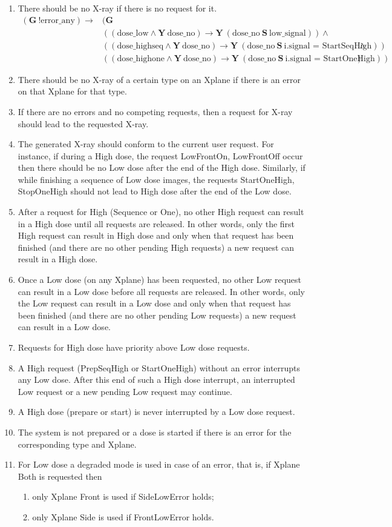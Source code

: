 \documentclass[a4paper,10pt]{article}
\newcommand{\LTLG}{\mathbf{G~}}
\newcommand{\LTLY}{\mathbf{Y~}}
\newcommand{\LTLS}{\mathbf{~S~}}
\newcommand{\imply}{\rightarrow}
\newcommand{\doselow}{\textrm{dose\_low}}
\newcommand{\doseno}{\textrm{dose\_no}}
\newcommand{\dosehighseq}{\textrm{dose\_highseq}}
\newcommand{\dosehighone}{\textrm{dose\_highone}}
\newcommand{\lowsignal}{\textrm{low\_signal}}
\newcommand{\errorany}{\textrm{error\_any}}
\begin{document}
	\begin{enumerate}
		\item There should be no X-ray if there is no request for it.
			\begin{align*}
				(\LTLG !\errorany) \imply & (\LTLG \\
					& ((\doselow \land \LTLY \doseno) \imply \LTLY (\doseno \LTLS \lowsignal)) \land \\
					& ((\dosehighseq \land \LTLY \doseno) \imply \LTLY (\doseno \LTLS \textrm{i.signal = StartSeqHigh})) \land \\
					& ((\dosehighone \land \LTLY \doseno) \imply \LTLY (\doseno \LTLS \textrm{i.signal = StartOneHigh})))
			\end{align*}
		\item There should be no X-ray of a certain type on an Xplane if there is an error on that Xplane for that type.
		\item If there are no errors and no competing requests, then a request for X-ray should lead to the requested X-ray.
		\item The generated X-ray should conform to the current user request. For instance, if during a High dose, the request LowFrontOn, LowFrontOff occur then there should be no Low dose after the end of the High dose. Similarly, if while finishing a sequence of Low dose images, the requests StartOneHigh, StopOneHigh should not lead to High dose after the end of the Low dose.
		\item After a request for High (Sequence or One), no other High request can result in a High dose until all requests are released. In other words, only the first High request can result in High dose and only when that request has been finished (and there are no other pending High requests) a new request can result in a High dose.
		\item Once a Low dose (on any Xplane) has been requested, no other Low request can result in a Low dose before all requests are released. In other words, only the Low request can result in a Low dose and only when that request has been finished (and there are no other pending Low requests) a new request can result in a Low dose.
		\item Requests for High dose have priority above Low dose requests.
		\item A High request (PrepSeqHigh or StartOneHigh) without an error interrupts any Low dose. After this end of such a High dose interrupt, an interrupted Low request or a new pending Low request may continue.
		\item A High dose (prepare or start) is never interrupted by a Low dose request.
		\item The system is not prepared or a dose is started if there is an error for the corresponding type and Xplane.
		\item For Low dose a degraded mode is used in case of an error, that is, if Xplane Both is requested then
			\begin{enumerate}
				\item only Xplane Front is used if SideLowError holds;
				\item only Xplane Side is used if FrontLowError holds.
			

\end{enumerate}
\end{enumerate}
\end{document}
